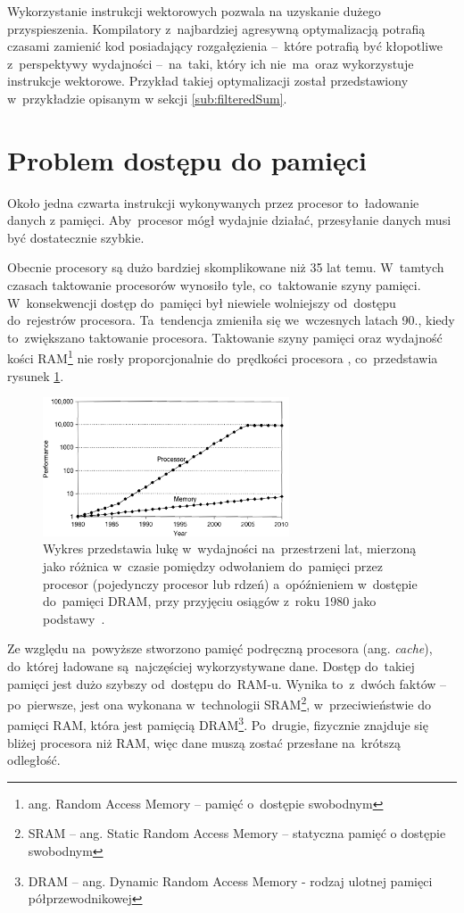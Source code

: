 Wykorzystanie instrukcji wektorowych pozwala na uzyskanie dużego przyspieszenia. 
Kompilatory z~najbardziej agresywną optymalizacją potrafią czasami zamienić kod posiadający rozgałęzienia --~które potrafią być kłopotliwe z~perspektywy wydajności --~na~taki, który ich nie~ma~oraz wykorzystuje instrukcje wektorowe. Przykład takiej optymalizacji został przedstawiony w~przykładzie opisanym w sekcji \ref{sub:filteredSum}.

\section{Problem dostępu do pamięci}

Około jedna czwarta instrukcji wykonywanych przez procesor to~ładowanie danych z pamięci. Aby~procesor mógł wydajnie działać, przesyłanie danych musi być dostatecznie szybkie.

Obecnie procesory są dużo bardziej skomplikowane niż 35 lat temu. W~tamtych czasach taktowanie procesorów wynosiło tyle, co~taktowanie szyny pamięci. W~konsekwencji dostęp do~pamięci był niewiele wolniejszy od~dostępu do~rejestrów procesora. Ta~tendencja zmieniła się we~wczesnych latach 90., kiedy to~zwiększano taktowanie procesora. Taktowanie szyny pamięci oraz wydajność kości RAM\footnote{ang. Random Access Memory – pamięć o~dostępie swobodnym} nie rosły proporcjonalnie do~prędkości procesora \cite{WhatEveryScientistShouldKnowAboutMemory}, co~przedstawia rysunek \ref{fig:cpu_mem_gap}.

\begin{figure}[!h]
	\centering
	\includegraphics[width=0.65\textwidth]{images/cpu_to_memory_gap}
	\caption{Wykres przedstawia lukę w~wydajności na~przestrzeni lat, mierzoną jako różnica w~czasie pomiędzy odwołaniem do~pamięci przez procesor (pojedynczy procesor lub rdzeń) a~opóźnieniem w~dostępie do~pamięci DRAM, przy przyjęciu osiągów z~roku 1980 jako podstawy~\cite{cpu_mem_gap}.}
	\label{fig:cpu_mem_gap}
\end{figure}

Ze względu na~powyższe stworzono pamięć podręczną procesora (ang. \textit{cache}), do~której ładowane są~najczęściej wykorzystywane dane. Dostęp do~takiej pamięci jest dużo szybszy od~dostępu do~RAM-u. Wynika to~z~dwóch faktów -- po~pierwsze, jest ona wykonana w~technologii SRAM\footnote{SRAM -- ang. Static Random Access Memory -- statyczna pamięć o dostępie swobodnym}, w~przeciwieństwie do pamięci RAM, która jest pamięcią DRAM\footnote{DRAM -- ang. Dynamic Random Access Memory - rodzaj ulotnej pamięci półprzewodnikowej}. Po~drugie, fizycznie znajduje się bliżej procesora niż RAM, więc dane muszą zostać przesłane na~krótszą odległość.



